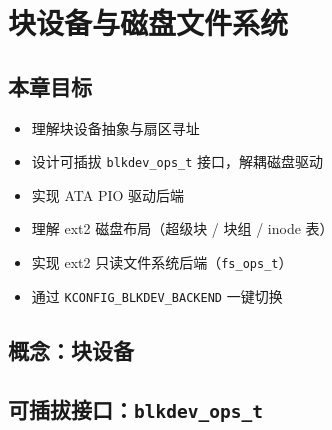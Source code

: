 \chapter{块设备与磁盘文件系统}
\label{ch:diskfs}

\section{本章目标}

\begin{itemize}
  \item 理解块设备抽象与扇区寻址
  \item 设计可插拔 \texttt{blkdev\_ops\_t} 接口，解耦磁盘驱动
  \item 实现 ATA PIO 驱动后端
  \item 理解 ext2 磁盘布局（超级块 / 块组 / inode 表）
  \item 实现 ext2 只读文件系统后端（\texttt{fs\_ops\_t}）
  \item 通过 \texttt{KCONFIG\_BLKDEV\_BACKEND} 一键切换
\end{itemize}

\section{概念：块设备}
\label{sec:diskfs-blkdev}


\section{可插拔接口：\texttt{blkdev\_ops\_t}}
\label{sec:diskfs-blkdev-interface}

